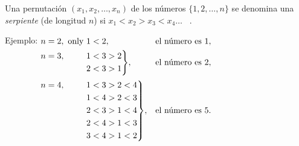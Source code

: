 \documentclass[12pt]{article}  %
\begin{document}
\bigskip
{} Una pernutaci\'on $(x_1,x_2, \dots,x_n)$ de los n\'umeros $\{1, 2, \dots, n\}$ se denomina una
    \emph{serpiente} (de longitud $n$) si $x_1<x_2>x_3<x_4 \dots$ \  .
    \medskip

{\sc Ejemplo:}
$\begin{aligned}[t]
&\begin{aligned}[t] n=2, \text{ only }  1<2, \end{aligned} &&\text{el n\'umero es  }1, \\
&\hskip-\nulldelimiterspace\mathord{\left.\begin{aligned} n=3, \hphantom{\text{ only }} 1&<3>2 \\ 
                                              2&<3>1\end{aligned} \right\}}, && \text{el n\'umero es  }2,  \\[2pt]
&\hskip-\nulldelimiterspace\mathord{\left.\begin{aligned} n=4, \hphantom{\text{ only }} 1&<3>2<4 \\ 
                                              1&<4>2<3 \\ 
                                    2&<3>1<4 \\ 
                                    2&<4>1<3 \\ 
                                    3&<4>1<2\end{aligned} \right\}},
                                    &&\text{el n\'umero es  }5. \\
\end{aligned}$

\end{document}
